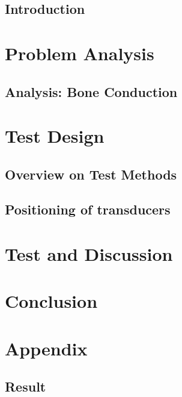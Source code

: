 \glsresetall
 \graphicspath{{figures/analysing/}}
\chapter{Introduction}\label{ch:intro}



\part{Problem Analysis}\label{pt:analysis} \glsresetall
\graphicspath{{figures/analysis/}}
\chapter{Analysis: Bone Conduction}\label{ch:bone_conductors}







\part{Test Design}\label{pt:design} 
\graphicspath{{figures/design/}}	
\chapter{Overview on Test Methods}\label{ch:test_methopd}

\chapter{Positioning of transducers}\label{ch:optimization}




\part{Test and Discussion}\label{pt:test}
\graphicspath{{figures/tests/}}


 
\part{Conclusion}\label{pt:conclusion}



\glsresetall
\appendix %

 \graphicspath{{figures/appendix/}}
\part{Appendix}\label{pt:appendix}

%
\chapter{Result}


